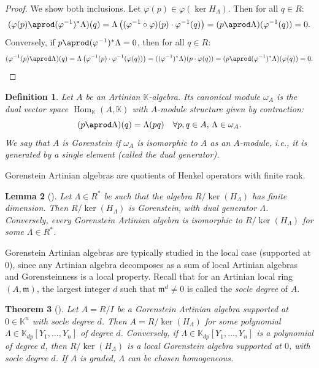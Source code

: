 \documentclass[a4paper,11p]{amsart}
\newtheorem{defn0}{Definition}[section]
\newtheorem{thm0}[defn0]{Theorem}
\newtheorem{lemma0}[defn0]{Lemma}
\newenvironment{definition}{ \begin{defn0}}{\end{defn0}}
\newenvironment{theorem}{\bigskip \begin{thm0}}{\end{thm0}}
\newenvironment{lemma}{\bigskip \begin{lemma0}}{\end{lemma0}}
\newcommand{\K}{\mathbb K}
\begin{document}
\begin{proof}
    We show both inclusions. Let $\varphi(p) \in \varphi(\ker H_\Lambda)$. Then for all $q \in R$:
    \[
    (\varphi(p) \aprod (\varphi^{-1})^* \Lambda)(q) = \Lambda\left( (\varphi^{-1} \circ \varphi)(p) \cdot \varphi^{-1}(q) \right) = (p \aprod \Lambda)(\varphi^{-1}(q)) = 0.
    \]
    Conversely, if $p \aprod (\varphi^{-1})^* \Lambda = 0$, then for all $q \in R$:
    \[
    (\varphi^{-1}(p) \aprod \Lambda)(q) = \Lambda\left( \varphi^{-1}(p) \cdot \varphi^{-1}(\varphi(q)) \right) = ((\varphi^{-1})^* \Lambda)(p \cdot \varphi(q)) = (p \aprod (\varphi^{-1})^* \Lambda)(\varphi(q)) = 0.
    \]
\end{proof}
\begin{definition}
    Let $A$ be an Artinian $\K$-algebra. Its \emph{canonical module} $\omega_A$ is the dual vector space $\operatorname{Hom}_\K(A, \K)$ with $A$-module structure given by contraction:
    \[
    (p \aprod \Lambda)(q) = \Lambda(pq) \quad \forall p,q \in A,\, \Lambda \in \omega_A.
    \]
    We say that $A$ is \emph{Gorenstein} if $\omega_A$ is isomorphic to $A$ as an $A$-module, i.e., it is generated by a single element (called the \emph{dual generator}).
\end{definition}


Gorenstein Artinian algebras are quotients of Henkel operators with finite rank.

\begin{lemma}[{\cite[\S 3.1]{Polyexp}}]\label{lemma: GorensteinHankel}
    Let $\Lambda \in R^*$ be such that the algebra $R / \ker(H_\Lambda)$ has finite dimension. Then $R / \ker(H_\Lambda)$ is Gorenstein, with dual generator $\Lambda$. Conversely, every Gorenstein Artinian algebra is isomorphic to $R / \ker(H_\Lambda)$ for some $\Lambda \in R^*$.
\end{lemma}

Gorenstein Artinian algebras are typically studied in the local case (supported at $0$), since any Artinian algebra decomposes as a sum of local Artinian algebras and Gorensteinness is a local property. Recall that for an Artinian local ring $(A, \mathfrak{m})$, the largest integer $d$ such that $\mathfrak{m}^d \neq 0$ is called the \emph{socle degree} of $A$.

\begin{theorem}[{\cite[Lemma 1.2]{Iarrobino}}]
    Let $A = R/I$ be a Gorenstein Artinian algebra supported at $0 \in \K^n$ with socle degree $d$. Then $A = R/\ker(H_\Lambda)$ for some polynomial $\Lambda \in \K_{dp}[Y_1, \ldots, Y_n]$ of degree $d$. Conversely, if $\Lambda \in \K_{dp}[Y_1, \ldots, Y_n]$ is a polynomial of degree $d$, then $R / \ker(H_\Lambda)$ is a local Gorenstein algebra supported at $0$, with socle degree $d$. If $A$ is graded, $\Lambda$ can be chosen homogeneous.
\end{theorem}
\end{document}
